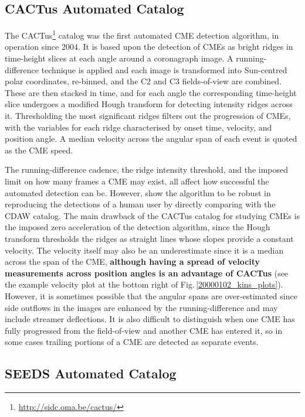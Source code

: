 \documentclass[referee,a4paper,12pt,traditabstract]{swsc}
\begin{document}
\begin{linenumbers}
\subsection{CACTus Automated Catalog}

The CACTus\footnote{\href{http://sidc.oma.be/cactus/}{http://sidc.oma.be/cactus/}} catalog was the first automated CME detection algorithm, in operation since 2004. It is based upon the detection of CMEs as bright ridges in time-height slices at each angle around a coronagraph image. A running-difference technique is applied and each image is transformed into Sun-centred polar coordinates, re-binned, and the C2 and C3 fields-of-view are combined. These are then stacked in time, and for each angle the corresponding time-height slice undergoes a modified Hough transform for detecting intensity ridges across it. Thresholding the most significant ridges filters out the progression of CMEs, with the variables for each ridge characterised by onset time, velocity, and position angle. A median velocity across the angular span of each event is quoted as the CME speed.

The running-difference cadence, the ridge intensity threshold, and the imposed limit on how many frames a CME may exist, all affect how successful the automated detection can be. However, \citet{2004A&A...425.1097R} show the algorithm to be robust in reproducing the detections of a human user by directly comparing with the CDAW catalog. The main drawback of the CACTus catalog for studying CMEs is the imposed zero acceleration of the detection algorithm, since the Hough transform thresholds the ridges as straight lines whose slopes provide a constant velocity. The velocity itself may also be an underestimate since it is a median across the span of the CME, {\bf although having a spread of velocity measurements across position angles is an advantage of CACTus} (see the example velocity plot at the bottom right of Fig.\,\ref{20000102_kins_plots}). However, it is sometimes possible that the angular spans are over-estimated since side outflows in the images are enhanced by the running-difference and may include streamer deflections. It is also difficult to distinguish when one CME has fully progressed from the field-of-view and another CME has entered it, so in some cases trailing portions of a CME are detected as separate events.

\subsection{SEEDS Automated Catalog}


\end{linenumbers}
\end{document}
